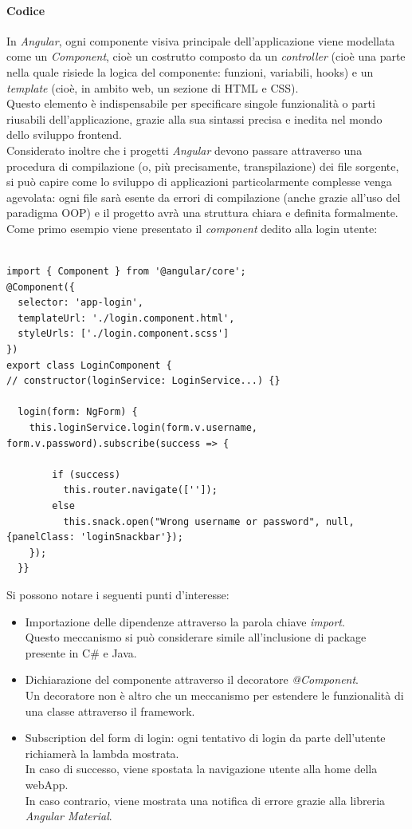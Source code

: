 \documentclass[12pt]{article}
\begin{document}
\paragraph{Codice}
In \textit{Angular}, ogni componente visiva principale dell'applicazione viene modellata come un \textit{Component}, cioè un costrutto composto da un \textit{controller} (cioè una parte nella quale risiede la logica del componente: funzioni, variabili, hooks) e un \textit{template} (cioè, in ambito web, un sezione di HTML e CSS).\\
Questo elemento è indispensabile per specificare singole funzionalità o parti riusabili dell'applicazione, grazie alla sua sintassi precisa e inedita nel mondo dello sviluppo frontend.\\
Considerato inoltre che i progetti \textit{Angular} devono passare attraverso una procedura di compilazione (o, più precisamente, transpilazione) dei file sorgente, si può capire come lo sviluppo di applicazioni particolarmente complesse venga agevolata: ogni file sarà esente da errori di compilazione (anche grazie all'uso del paradigma OOP) e il progetto avrà una struttura chiara e definita formalmente.
\newpage
Come primo esempio viene presentato il \textit{component} dedito alla login utente:
\begin{lstlisting}

import { Component } from '@angular/core';
@Component({
  selector: 'app-login',
  templateUrl: './login.component.html',
  styleUrls: ['./login.component.scss']
})
export class LoginComponent {
// constructor(loginService: LoginService...) {}

  login(form: NgForm) {
    this.loginService.login(form.v.username, form.v.password).subscribe(success => {     
     
        if (success) 
          this.router.navigate(['']);
        else
          this.snack.open("Wrong username or password", null, {panelClass: 'loginSnackbar'});
    });
  }}
\end{lstlisting}
\phantom{\\}
Si possono notare i seguenti punti d'interesse: 
\begin{itemize}
\item Importazione delle dipendenze attraverso la parola chiave \textit{import}.\\
Questo meccanismo si può considerare simile all'inclusione di package presente in C\# e Java.
\item Dichiarazione del componente attraverso il decoratore \textit{@Component}.\\ 
Un decoratore non è altro che un meccanismo per estendere le funzionalità di una classe attraverso il framework.
\item Subscription del form di login: ogni tentativo di login da parte dell'utente richiamerà la lambda mostrata.\\
In caso di successo, viene spostata la navigazione utente alla home della webApp.\\
In caso contrario, viene mostrata una notifica di errore grazie alla libreria \textit{Angular Material}.
\end{itemize}
\end{document}
